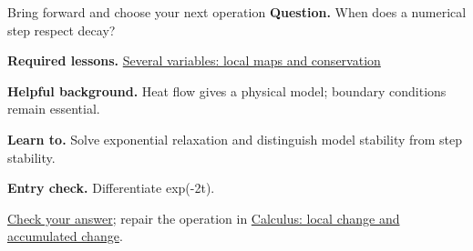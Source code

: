 \begin{learningcard}{Bring forward and choose your next operation}
\textsf{\textbf{Question.}} When does a numerical step respect decay?\par
\textbf{Required lessons.} \hyperref[learn:multivariable]{Several variables: local maps and conservation}\par
\textbf{Helpful background.} Heat flow gives a physical model; boundary conditions remain essential.\par
\textbf{Learn to.} Solve exponential relaxation and distinguish model stability from step stability.\par
\textbf{Entry check.} Differentiate exp(-2t).\par
\hyperref[solution:entry:dynamics]{Check your answer}; repair the operation in \hyperref[learn:calculus]{Calculus: local change and accumulated change}.
\end{learningcard}
